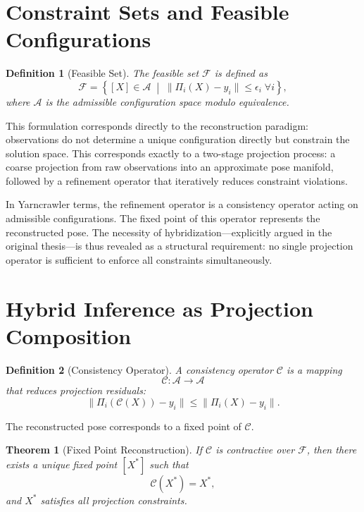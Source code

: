 \documentclass[12pt]{article}
\newtheorem{definition}{Definition}
\newtheorem{theorem}{Theorem}
\begin{document}
\section{Constraint Sets and Feasible Configurations}

\begin{definition}[Feasible Set]
The feasible set $\mathcal{F}$ is defined as
\[
\mathcal{F} = \left\{ [X] \in \mathcal{A} \;\middle|\; \|\Pi_i(X) - y_i\| \leq \epsilon_i \;\forall i \right\},
\]
where $\mathcal{A}$ is the admissible configuration space modulo equivalence.
\end{definition}

This formulation corresponds directly to the reconstruction paradigm: observations do not determine a unique configuration directly but constrain the solution space. This corresponds exactly to a two-stage projection process: a coarse projection from raw observations into an approximate pose manifold, followed by a refinement operator that iteratively reduces constraint violations.

In Yarncrawler terms, the refinement operator is a consistency operator acting on admissible configurations. The fixed point of this operator represents the reconstructed pose. The necessity of hybridization---explicitly argued in the original thesis---is thus revealed as a structural requirement: no single projection operator is sufficient to enforce all constraints simultaneously.

\section{Hybrid Inference as Projection Composition}

\begin{definition}[Consistency Operator]
A consistency operator $\mathcal{C}$ is a mapping
\[
\mathcal{C} : \mathcal{A} \to \mathcal{A}
\]
that reduces projection residuals:
\[
\|\Pi_i(\mathcal{C}(X)) - y_i\| \leq \|\Pi_i(X) - y_i\|.
\]
\end{definition}

The reconstructed pose corresponds to a fixed point of $\mathcal{C}$.

\begin{theorem}[Fixed Point Reconstruction]
If $\mathcal{C}$ is contractive over $\mathcal{F}$, then there exists a unique fixed point $[X^*]$ such that
\[
\mathcal{C}(X^*) = X^*,
\]
and $X^*$ satisfies all projection constraints.
\end{theorem}
\end{document}
